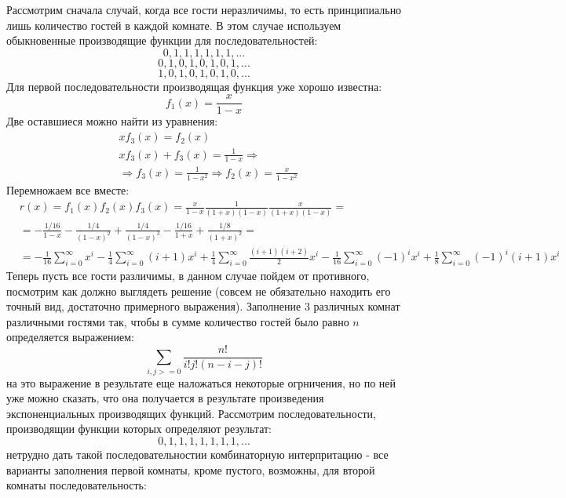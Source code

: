 \documentclass[a4paper,12pt]{article}
\begin{document}
\begin{Solution}
Рассмотрим сначала случай, когда все гости неразличимы, то есть принципиально лишь количество гостей в каждой комнате. В этом случае используем обыкновенные производящие функции для последовательностей:
\[
	0, 1, 1, 1, 1, 1, 1, ...
\]
\[
	0, 1, 0, 1, 0, 1, 0, 1, ...
\]
\[
	1, 0, 1, 0, 1, 0, 1, 0, ...
\]
Для первой последовательности производящая функция уже хорошо известна:
\[
	f_1\left(x\right) = \frac{x}{1-x}
\]
Две оставшиеся можно найти из уравнения:
\[
	\begin{split}
		& x f_3\left(x\right) = f_2\left(x\right) \\
		& x f_3\left(x\right) + f_3\left(x\right) = \frac{1}{1 - x} \Rightarrow \\
		& \Rightarrow f_3\left(x\right) = \frac{1}{1 - x^2} \Rightarrow f_2\left(x\right) = \frac{x}{1 - x^2}
	\end{split}
\]
Перемножаем все вместе:
\[
	\begin{split}
		& r\left(x\right) = f_1\left(x\right) f_2\left(x\right) f_3\left(x\right) = \frac{x}{1 - x} \frac{1}{\left(1 + x\right)\left(1 - x\right)} \frac{x}{\left(1 + x\right)\left(1 - x\right)} = \\
		& = - \frac{1/16}{1 - x} - \frac{1/4}{\left(1 - x\right)^2} + \frac{1/4}{\left(1 - x\right)^3} - \frac{1/16}{1 + x} + \frac{1/8}{\left(1 + x\right)^2} = \\
		& = -\frac{1}{16}\sum_{i=0}^{\infty}x^i - \frac{1}{4}\sum_{i=0}^{\infty} \left(i+1\right) x^i + \frac{1}{4} \sum_{i=0}^{\infty} \frac{\left(i+1\right)\left(i+2\right)}{2} x^i - \frac{1}{16}\sum_{i=0}^{\infty} \left(-1\right)^i x^i + \frac{1}{8}\sum_{i=0}^{\infty}\left(-1\right)^i\left(i+1\right)x^i
	\end{split}
\]
Теперь пусть все гости различимы, в данном случае пойдем от противного, посмотрим как должно выглядеть решение (совсем не обязательно находить его точный вид, достаточно примерного выражения). Заполнение 3 различных комнат различными гостями так, чтобы в сумме количество гостей было равно $n$ определяется выражением:
\[
	\sum_{i, j >= 0} \frac{n!}{i! j! \left(n - i - j\right)!}
\]
на это выражение в результате еще наложаться некоторые огрничения, но по ней уже можно сказать, что она получается в результате произведения экспоненциальных производящих функций. Рассмотрим последовательности, производящии функции которых определяют результат:
\[
	0, 1, 1, 1, 1, 1, 1, 1, ...
\]
нетрудно дать такой последовательностии комбинаторную интерпритацию - все варианты заполнения первой комнаты, кроме пустого, возможны, для второй комнаты последовательность:

\end{Solution}
\end{document}
